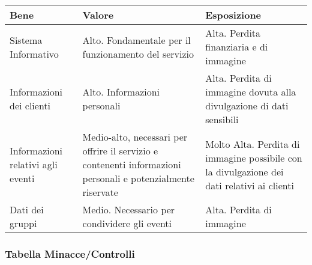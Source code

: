 \begin{tabular} {|P{3.5cm}|P{5.5cm}|P{6.7cm}|}
  \hline
  \textbf{Bene}                     & \textbf{Valore}                                                                                              & \textbf{Esposizione}      \\
  \hline
  Sistema Informativo               & Alto. Fondamentale per il funzionamento del servizio                                                         &
  Alta. Perdita finanziaria e di immagine                                                                                                                                      \\
  \hline
  Informazioni dei clienti          & Alto. Informazioni personali                                                                                 &
  Alta. Perdita di immagine dovuta alla divulgazione
  di dati sensibili                                                                                                                                                            \\
  \hline
  Informazioni relativi agli eventi & Medio-alto, necessari per offrire il servizio e contenenti informazioni personali e potenzialmente riservate &
  Molto Alta. Perdita di immagine possibile con la divulgazione dei dati relativi ai
  clienti                                                                                                                                                                      \\
  \hline
  Dati dei gruppi                   & Medio. Necessario per condividere gli eventi                                                                 & Alta. Perdita di immagine \\
  \hline
\end{tabular}

\subsubsection{Tabella Minacce/Controlli}

